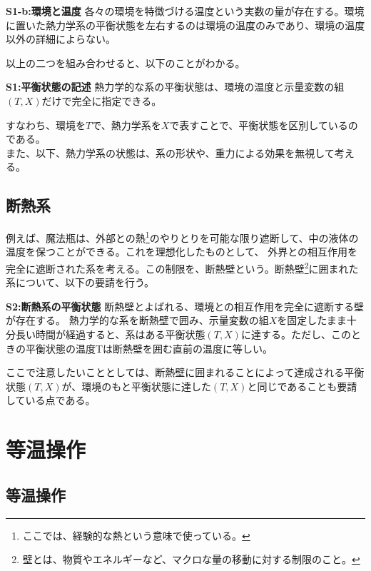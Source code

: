 \documentclass[a4paper,11pt]{jsarticle}
\numberwithin{equation}{section}
\begin{document}
\begin{itembox}[l]{\textbf{S1-b:環境と温度}}
    各々の環境を特徴づける温度という実数の量が存在する。環境に置いた熱力学系の平衡状態を左右するのは環境の温度のみであり、環境の温度以外の詳細によらない。
\end{itembox}
以上の二つを組み合わせると、以下のことがわかる。\\
\begin{itembox}[l]{\textbf{S1:平衡状態の記述}}
    熱力学的な系の平衡状態は、環境の温度と示量変数の組$(T,X)$だけで完全に指定できる。
\end{itembox}
すなわち、環境を$T$で、熱力学系を$X$で表すことで、平衡状態を区別しているのである。\\

また、以下、熱力学系の状態は、系の形状や、重力による効果を無視して考える。\\

\subsection{断熱系}
例えば、魔法瓶は、外部との熱\footnote{ここでは、経験的な熱という意味で使っている。}のやりとりを可能な限り遮断して、中の液体の温度を保つことができる。これを理想化したものとして、
外界との相互作用を完全に遮断された系を考える。この制限を、断熱壁という。断熱壁\footnote{壁とは、物質やエネルギーなど、マクロな量の移動に対する制限のこと。}に囲まれた系について、以下の要請を行う。
\begin{itembox}[l]{\textbf{S2:断熱系の平衡状態}}
    断熱壁とよばれる、環境との相互作用を完全に遮断する壁が存在する。
    熱力学的な系を断熱壁で囲み、示量変数の組$X$を固定したまま十分長い時間が経過すると、系はある平衡状態$(T,X)$に達する。ただし、このときの平衡状態の温度Tは断熱壁を囲む直前の温度に等しい。
\end{itembox}
ここで注意したいこととしては、断熱壁に囲まれることによって達成される平衡状態$(T,X)$が、環境のもと平衡状態に達した$(T,X)$と同じであることも要請している点である。\\

\section{等温操作}
\subsection{等温操作}
\end{document}
